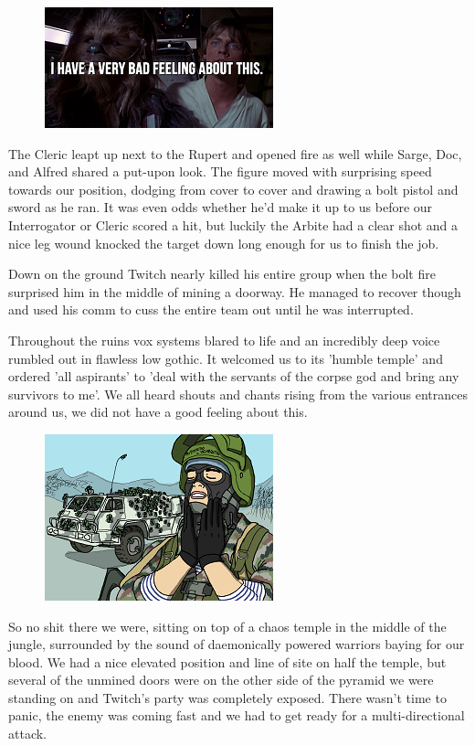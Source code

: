 \begin{figure}
	\begin{center}
		\includegraphics[width=\figwidth]{pics/6/39.png}
	\end{center}
\end{figure}
The Cleric leapt up next to the Rupert and opened fire as well while Sarge, Doc, and Alfred shared a put-upon look. 
The figure moved with surprising speed towards our position, dodging from cover to cover and drawing a bolt pistol and sword as he ran. 
It was even odds whether he'd make it up to us before our Interrogator or Cleric scored a hit, but luckily the Arbite had a clear shot and a nice leg wound knocked the target down long enough for us to finish the job.

Down on the ground Twitch nearly killed his entire group when the bolt fire surprised him in the middle of mining a doorway. 
He managed to recover though and used his comm to cuss the entire team out until he was interrupted.

Throughout the ruins vox systems blared to life and an incredibly deep voice rumbled out in flawless low gothic. 
It welcomed us to its 'humble temple' and ordered 'all aspirants' to 'deal with the servants of the corpse god and bring any survivors to me'. 
We all heard shouts and chants rising from the various entrances around us, we did not have a good feeling about this.

\begin{figure}
	\begin{center}
		\includegraphics[width=\figwidth]{pics/6/40.png}
	\end{center}
\end{figure}
So no shit there we were, sitting on top of a chaos temple in the middle of the jungle, surrounded by the sound of daemonically powered warriors baying for our blood. 
We had a nice elevated position and line of site on half the temple, but several of the unmined doors were on the other side of the pyramid we were standing on and Twitch's party was completely exposed. 
There wasn't time to panic, the enemy was coming fast and we had to get ready for a multi-directional attack.

